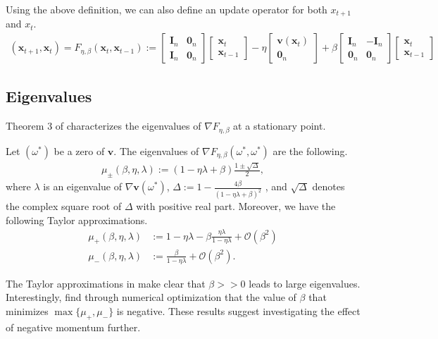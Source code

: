 \documentclass{article}
\renewcommand{\vec}[1]{\ensuremath{\boldsymbol{#1}}}
\newcommand{\vecfield}{\vec{v}}
\begin{document}
Using the above definition, we can also define an update operator for both $x_{t + 1}$ and $x_t$.%
\begin{align}\label{eq:momentum-operator}
    (\vec{x}_{t + 1}, \vec{x}_t) = F_{\eta, \beta}(\vec{x}_{t}, \vec{x}_{t - 1}) := 
    \begin{bmatrix}
        \vec{I}_n & \vec{0}_n \\
        \vec{I}_n & \vec{0}_n
    \end{bmatrix}
    \begin{bmatrix}
        \vec{x}_t \\
        \vec{x}_{t-1}
    \end{bmatrix} 
    - \eta 
    \begin{bmatrix}
        \vec{v}(\vec{x}_t) \\
        \vec{0}_n
    \end{bmatrix} 
    + \beta 
    \begin{bmatrix}
        \vec{I}_n & -\vec{I}_n \\
        \vec{0}_n & \vec{0}_n
    \end{bmatrix}
    \begin{bmatrix}
        \vec{x}_t \\
        \vec{x}_{t-1}
    \end{bmatrix} 
\end{align}

\subsection{Eigenvalues}
Theorem 3 of \citet{Gidel18NegMom} characterizes the eigenvalues of $\nabla F_{\eta, \beta}$ at a stationary point. 
\begin{thm}\label{thm:momentum-eigenvalues}
    Let $(\omega^*)$ be a zero of $\vecfield$. The eigenvalues of $\nabla F_{\eta, \beta}(\omega^*, \omega^*)$ are the following.
    \begin{align}
        \mu_{\pm} (\beta, \eta, \lambda) := (1 - \eta \lambda + \beta) \frac{1 \pm \sqrt{\Delta}}{2},
    \end{align}
    where $\lambda$ is an eigenvalue of $\nabla \vecfield(\omega^*)$, $\Delta := 1 - \frac{4\beta }{(1 - \eta \lambda + \beta)^2}$ , and $\sqrt{\Delta}$ denotes the complex square root of $\Delta$ with positive real part. Moreover, we have the following Taylor approximations.
    \begin{align}
        \mu_+(\beta, \eta, \lambda) &:= 1 - \eta \lambda - \beta \frac{\eta \lambda}{1 - \eta \lambda} + \mathcal{O}(\beta^2)\\
        \mu_-(\beta, \eta, \lambda) &:= \frac{\beta }{1 - \eta \lambda } + \mathcal{O}(\beta^2).
    \end{align}
\end{thm}
The Taylor approximations in  make clear that $\beta >> 0$ leads to large eigenvalues. Interestingly, \citet{Gidel18NegMom} find through numerical optimization that the value of $\beta$ that minimizes $\max\{\mu_+, \mu_-\}$ is negative. These results suggest investigating the effect of negative momentum further. 
\end{document}
